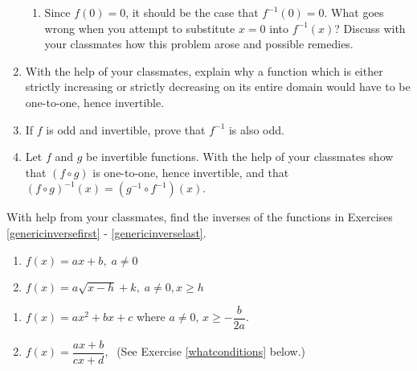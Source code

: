 \documentclass{ximera}
\begin{document}
\begin{enumerate}
\begin{enumerate}
\item  Since $f(0) = 0$, it should be the case that $f^{-1}(0) = 0$.  What goes wrong when you attempt to substitute $x=0$ into $f^{-1}(x)$?  Discuss with your classmates how this problem arose and possible remedies.

\end{enumerate}

\item With the help of your classmates, explain why a function which is either strictly increasing or strictly decreasing on its entire domain would have to be one-to-one, hence invertible.

\item If $f$ is odd and invertible, prove that $f^{-1}$ is also odd.

\item \label{fcircginverse} Let $f$ and $g$ be invertible functions.  With the help of your classmates show that $(f \circ g)$ is one-to-one, hence invertible, and that $(f \circ g)^{-1}(x) = (g^{-1} \circ f^{-1})(x)$.

\setcounter{HW}{\value{enumi}}
\end{enumerate}

With help from your classmates, find the inverses of the functions in Exercises \ref{genericinversefirst} - \ref{genericinverselast}.

\begin{multicols}{2}
\begin{enumerate}
\setcounter{enumi}{\value{HW}}

\item $f(x) = ax + b, \; a \neq 0$ \label{genericinversefirst}
\item $f(x) = a\sqrt{x - h} + k, \; a \neq 0, x \geq h$


\setcounter{HW}{\value{enumi}}
\end{enumerate}
\end{multicols}

\begin{multicols}{2}
\begin{enumerate}
\setcounter{enumi}{\value{HW}}
\item $f(x) = ax^{2} + bx + c$ where $a \neq 0, \, x \geq -\dfrac{b}{2a}$.

\item $f(x) = \dfrac{ax + b}{cx + d},\;$ (See Exercise \ref{whatconditions} below.) \label{genericinverselast}

\setcounter{HW}{\value{enumi}}
\end{enumerate}
\end{multicols}
\end{document}
